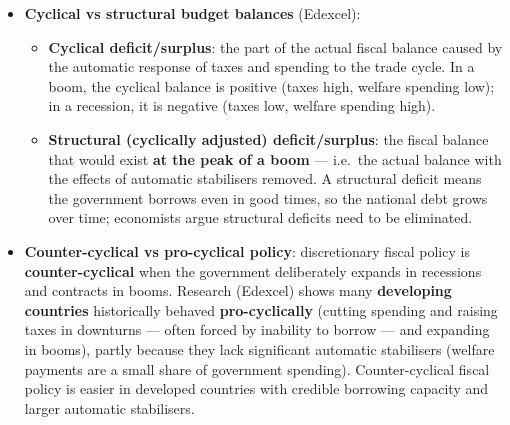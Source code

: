 \documentclass[a4paper,12pt]{article}
\begin{document}
\begin{itemize}
\begin{itemize}
    \item \textbf{Precision}: discretionary policy can target specific sectors and can be large enough to close deep gaps; automatic stabilisers only \textit{dampen} fluctuations --- they cannot prevent a recession or eliminate a gap on their own.
  \end{itemize}
  \item \textbf{Cyclical vs structural budget balances} (Edexcel):
  \begin{itemize}
    \item \textbf{Cyclical deficit/surplus}: the part of the actual fiscal balance caused by the automatic response of taxes and spending to the trade cycle. In a boom, the cyclical balance is positive (taxes high, welfare spending low); in a recession, it is negative (taxes low, welfare spending high).
    \item \textbf{Structural (cyclically adjusted) deficit/surplus}: the fiscal balance that would exist \textbf{at the peak of a boom} --- i.e.\ the actual balance with the effects of automatic stabilisers removed. A structural deficit means the government borrows even in good times, so the national debt grows over time; economists argue structural deficits need to be eliminated.
  \end{itemize}
  \item \textbf{Counter-cyclical vs pro-cyclical policy}: discretionary fiscal policy is \textbf{counter-cyclical} when the government deliberately expands in recessions and contracts in booms. Research (Edexcel) shows many \textbf{developing countries} historically behaved \textbf{pro-cyclically} (cutting spending and raising taxes in downturns --- often forced by inability to borrow --- and expanding in booms), partly because they lack significant automatic stabilisers (welfare payments are a small share of government spending). Counter-cyclical fiscal policy is easier in developed countries with credible borrowing capacity and larger automatic stabilisers.
\end{itemize}
\end{document}
